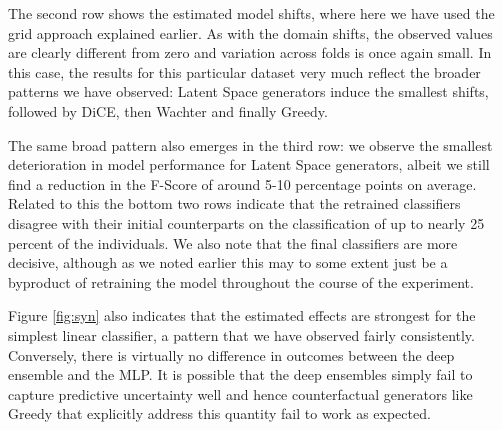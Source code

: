 \documentclass[conference,final,]{IEEEtran}
\begin{document}
The second row shows the estimated model shifts, where here we have used the grid approach explained earlier. As with the domain shifts, the observed values are clearly different from zero and variation across folds is once again small. In this case, the results for this particular dataset very much reflect the broader patterns we have observed: Latent Space generators induce the smallest shifts, followed by DiCE, then Wachter and finally Greedy.

The same broad pattern also emerges in the third row: we observe the smallest deterioration in model performance for Latent Space generators, albeit we still find a reduction in the F-Score of around 5-10 percentage points on average. Related to this the bottom two rows indicate that the retrained classifiers disagree with their initial counterparts on the classification of up to nearly 25 percent of the individuals. We also note that the final classifiers are more decisive, although as we noted earlier this may to some extent just be a byproduct of retraining the model throughout the course of the experiment.

Figure \ref{fig:syn} also indicates that the estimated effects are strongest for the simplest linear classifier, a pattern that we have observed fairly consistently. Conversely, there is virtually no difference in outcomes between the deep ensemble and the MLP. It is possible that the deep ensembles simply fail to capture predictive uncertainty well and hence counterfactual generators like Greedy that explicitly address this quantity fail to work as expected.
\end{document}
